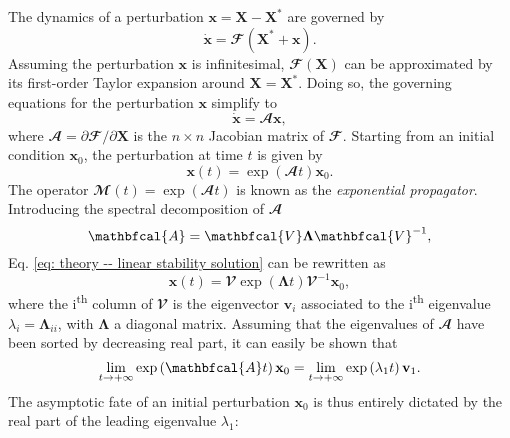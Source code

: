   The dynamics of a perturbation $\mathbf{x} = \mathbf{X} - \mathbf{X}^*$ are governed by
  \begin{equation}
    \dot{\mathbf{x}} = \mathbfcal{F}(\mathbf{X}^* + \mathbf{x}).
  \end{equation}
  Assuming the perturbation $\mathbf{x}$ is infinitesimal, $\mathbfcal{F}(\mathbf{X})$ can be approximated by its first-order Taylor expansion around $\mathbf{X} = \mathbf{X}^*$. Doing so, the governing equations for the perturbation $\mathbf{x}$ simplify to
  \begin{equation}
    \dot{\mathbf{x}} = \mathbfcal{A}\mathbf{x},
    \label{eq: theory -- linear perturbation dynamics}
  \end{equation}
  where $\mathbfcal{A}=\partial\mathbfcal{F}/\partial\mathbf{X}$ is the $n \times n$ Jacobian matrix of $\mathbfcal{F}$. Starting from an initial condition $\mathbf{x}_0$, the perturbation at time $t$ is given by
  \begin{equation}
    \mathbf{x}(t) = \exp \left( \mathbfcal{A}t \right) \mathbf{x}_0.
    \label{eq: theory -- linear stability solution}
  \end{equation}
  The operator $\mathbfcal{M}(t) = \exp \left( \mathbfcal{A}t \right)$ is known as the \emph{exponential propagator}. Introducing the spectral decomposition of $\mathbfcal{A}$
  \begin{equation}
    \mathbfcal{A} = \mathbfcal{V} \boldsymbol{\Lambda} \mathbfcal{V}^{-1},
    \notag
  \end{equation}
  Eq. \eqref{eq: theory -- linear stability solution} can be rewritten as
  \begin{equation}
    \mathbf{x}(t) = \mathbfcal{V} \exp \left( \boldsymbol{\Lambda} t \right) \mathbfcal{V}^{-1} \mathbf{x}_0,
  \end{equation}
  where the i\textsuperscript{th} column of $\mathbfcal{V}$ is the eigenvector $\mathbf{v}_i$ associated to the i\textsuperscript{th} eigenvalue $\lambda_i = \boldsymbol{\Lambda}_{ii}$, with $\boldsymbol{\Lambda}$ a diagonal matrix. Assuming that the eigenvalues of $\mathbfcal{A}$ have been sorted by decreasing real part, it can easily be shown that
  \begin{equation}
    \lim\limits_{t \to + \infty} \exp \left( \mathbfcal{A} t \right) \mathbf{x}_0 = \lim \limits_{t \to + \infty} \exp \left( \lambda_1 t \right) \mathbf{v}_1 .
    \notag
  \end{equation}
  The asymptotic fate of an initial perturbation $\mathbf{x}_0$ is thus entirely dictated by the real part of the leading eigenvalue $\lambda_1$:
